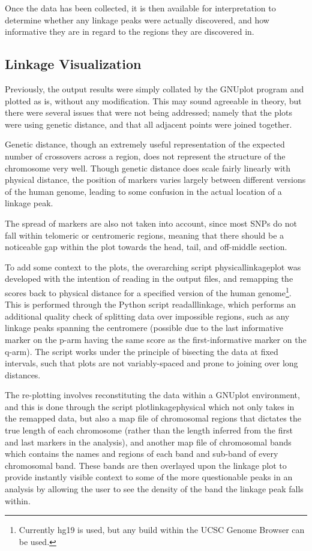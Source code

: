 Once the data has been collected, it is then available for interpretation to determine whether any linkage peaks were actually discovered, and how informative they are in regard to the regions they are discovered in.

\subsection{Linkage Visualization}

Previously, the output results were simply collated by the GNUplot program and plotted as is, without any modification. This may sound agreeable in theory, but there were several issues that were not being addressed; namely that the plots were using genetic distance, and that all adjacent points were joined together.

Genetic distance, though an extremely  useful representation of the expected number of crossovers across a region, does not represent the structure of the chromosome very well. Though genetic distance does scale fairly linearly with physical distance, the position of markers varies largely between different versions of the human genome, leading to some confusion in the actual location of a linkage peak.

The spread of markers are also not taken into account, since most SNPs do not fall within telomeric or centromeric regions, meaning that there should be a noticeable gap within the plot towards the head, tail, and off-middle section.

To add some context to the plots, the overarching script \gls{physicallinkageplot} was developed with the intention of reading in the output files, and remapping the scores back to physical distance for a specified version of the human genome\footnote{Currently hg19 is used, but any build within the UCSC Genome Browser can be used.}. This is performed through the Python script \gls{readalllinkage}, which performs an additional quality check of splitting data over impossible regions, such as any linkage peaks spanning the centromere (possible due to the last informative marker on the p-arm having the same score as the first-informative marker on the q-arm). The script works under the principle of bisecting the data at fixed intervals, such that plots are not variably-spaced and prone to joining over long distances.

The re-plotting involves reconstituting the data within a GNUplot  environment, and this is done through the script \gls{plotlinkagephysical} which not only takes in the remapped data, but also a map file of chromosomal regions that dictates the true length of each chromosome (rather than the length inferred from the first and last markers in the analysis), and another map file of chromosomal bands which contains the names and regions of each band and sub-band of every chromosomal band. These bands are then overlayed upon the linkage plot to provide instantly visible context to some of the more questionable peaks in an analysis by allowing the user to see the density of the band the linkage peak falls within.

